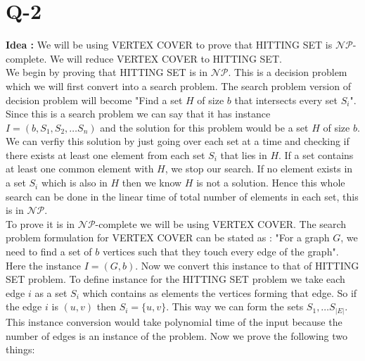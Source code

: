 \documentclass[14pt]{article}
\newcommand{\nonp}{$\mathcal{NP}$}
\begin{document}
	\section*{Q-2}
		\noindent
		\textbf{Idea : }We will be using VERTEX COVER to prove that HITTING SET is \nonp-complete. We will reduce VERTEX COVER to HITTING SET. \\
		\newline
		We begin by proving that HITTING SET is in \nonp. This is a decision problem which we will first convert into a search problem. The search problem version of decision problem will become "Find a set $H$ of size $b$ that intersects every set $S_i$". Since this is a search problem we can say that it has instance $I =(b, S_1, S_2, \dots S_n)$ and the solution for this problem would be a set $H$ of size $b$. We can verfiy this solution by just going over each set at a time and checking if there exists at least one element from each set $S_i$ that lies in $H$. If a set contains at least one common element with $H$, we stop our search. If no element exists in a set $S_i$ which is also in $H$ then we know $H$ is not a solution. Hence this whole search can be done in the linear time of total number of elements in each set, this is in \nonp.\\
		\newline
		To prove it is in \nonp-complete we will be using VERTEX COVER. The search problem formulation for VERTEX COVER can be stated as : "For a graph $G$, we need to find a set of $b$ vertices such that they touch every edge of the graph". Here the instance $I = (G, b)$. Now we convert this instance to that of HITTING SET problem. To define instance for the HITTING SET problem we take each edge $i$ as a set $S_i$ which contains as elements the vertices forming that edge. So if the edge $i$ is $(u, v)$ then $S_i = \{u, v\}$. This way we can form the sets $S_1, \dots S_{|E|}$. This instance conversion would take polynomial time of the input because the number of edges is an instance of the problem. Now we prove the following two things:
\end{document}
